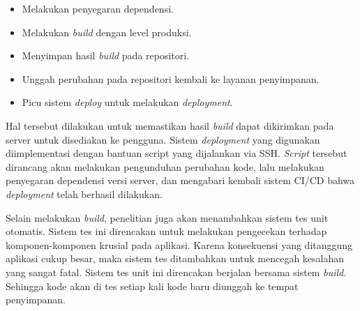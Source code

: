     \begin{itemize}
        \item Melakukan penyegaran dependensi.
        \item Melakukan \textit{build} dengan level produksi.
        \item Menyimpan hasil \textit{build} pada repositori.
        \item Unggah perubahan pada repositori kembali ke layanan penyimpanan.
        \item Picu sistem \textit{deploy} untuk melakukan \textit{deployment}.
    \end{itemize}
    
    Hal tersebut dilakukan untuk memastikan hasil \textit{build} dapat
    dikirimkan pada server untuk disediakan ke pengguna. Sistem
    \textit{deployment} yang digunakan diimplementasi dengan bantuan script yang
    dijalankan via SSH. \textit{Script} tersebut dirancang akan melakukan
    pengunduhan perubahan kode, lalu melakukan penyegaran dependensi versi
    server, dan mengabari kembali sistem CI/CD bahwa \textit{deployment} telah
    berhasil dilakukan.
    
    Selain melakukan \textit{build}, penelitian juga akan menambahkan sistem tes
    unit otomatis. Sistem tes ini direncakan untuk melakukan pengecekan terhadap
    komponen-komponen krusial pada aplikasi. Karena konsekuensi yang ditanggung
    aplikasi cukup besar, maka sistem tes ditambahkan untuk mencegah kesalahan
    yang sangat fatal. Sistem tes unit ini direncakan berjalan bersama sistem
    \textit{build}. Sehingga kode akan di tes setiap kali kode baru diunggah ke
    tempat penyimpanan.